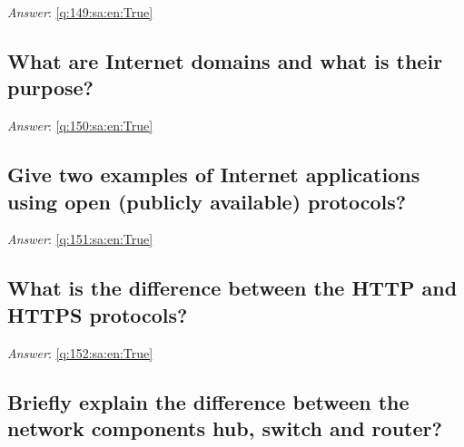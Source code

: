 \documentclass[a4paper,11pt,oneside]{article}
\begin{document}
\begin{sloppypar}
\textit{Answer}: \autoref{q:149:sa:en:True}



\subsection{What are Internet domains and what is their purpose?}

\label{q:150:sa:en:False}

\vspace{2cm}

\noindent\makebox[\textwidth]{\hrulefill}

\vspace{1cm}

\textit{Answer}: \autoref{q:150:sa:en:True}



\subsection{Give two examples of Internet applications using open (publicly available) protocols?}

\label{q:151:sa:en:False}

\vspace{2cm}

\noindent\makebox[\textwidth]{\hrulefill}

\vspace{1cm}

\textit{Answer}: \autoref{q:151:sa:en:True}



\subsection{What is the difference between the HTTP and HTTPS protocols?}

\label{q:152:sa:en:False}

\vspace{2cm}

\noindent\makebox[\textwidth]{\hrulefill}

\vspace{1cm}

\textit{Answer}: \autoref{q:152:sa:en:True}



\subsection{Briefly explain the difference between the network components hub, switch and router?}


\end{sloppypar}
\end{document}
